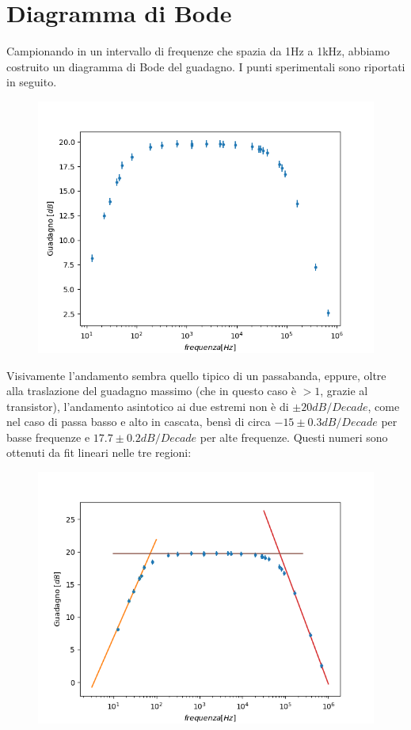 \documentclass[10pt,a4paper]{article}
\begin{document}
\section{Diagramma di Bode}
 Campionando in un intervallo di frequenze che spazia da 1\si{\hertz} a 1\si{\kilo\hertz}, abbiamo costruito un diagramma di Bode del guadagno. I punti sperimentali sono riportati in seguito.
 \begin{figure}[h]
 	\centering
 	\includegraphics[scale=0.5]{dataBodeplot.png}
	
	
\end{figure}
Visivamente l'andamento sembra quello tipico di un passabanda, eppure, oltre alla traslazione del guadagno massimo (che in questo caso è $> 1$, grazie al transistor), l'andamento asintotico ai due estremi non è di $\pm 20 dB/Decade$, come nel caso di passa basso e alto in cascata, bensì di circa $-15 \pm0.3dB/Decade $ per basse frequenze e $ 17.7\pm0.2 dB/Decade$ per alte frequenze.
Questi numeri sono ottenuti da fit lineari nelle tre regioni:
\begin{figure}[h]
	\centering
	\includegraphics[scale=0.5]{fit.png}
\end{figure}
\end{document}
